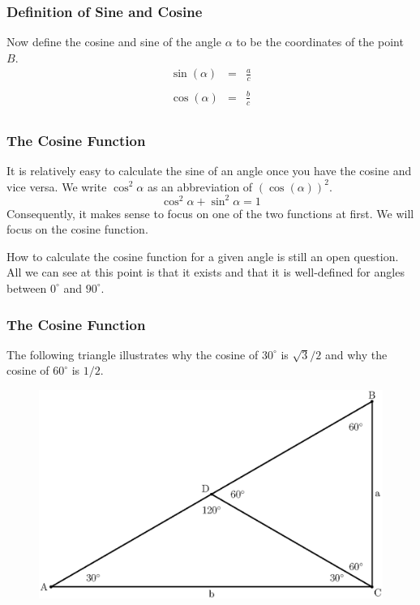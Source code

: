 \documentclass[xcolor=dvipsnames]{beamer}
\begin{document}
\begin{frame}
  \frametitle{Definition of Sine and Cosine}
Now define the cosine and sine of the angle $\alpha$ to be the
coordinates of the point $B$.
\begin{equation}
  \label{eq:eesiacha}
  \begin{array}{rcl}
    \sin(\alpha)&=&\frac{a}{c} \\
    && \\
    \cos(\alpha)&=&\frac{b}{c} \\
  \end{array}
\end{equation}
\end{frame}

\begin{frame}
  \frametitle{The Cosine Function}
  It is relatively easy to calculate the sine of an angle once you
  have the cosine and vice versa. We write $\cos^{2}\alpha$ as an
  abbreviation of $(\cos(\alpha))^{2}$.
  \begin{equation}
    \label{eq:aejeecob}
    \cos^{2}\alpha+\sin^{2}\alpha=1
  \end{equation}
  Consequently, it makes sense to focus on one of the two functions at
  first. We will focus on the cosine function.

  \bigskip
  
  How to calculate the cosine function for a given angle is still an
  open question. All we can see at this point is that it exists and
  that it is well-defined for angles between $0^{\circ}$ and
  $90^{\circ}$.
\end{frame}

\begin{frame}
  \frametitle{The Cosine Function}
  The following triangle illustrates why the cosine of
  $30^{\circ}$ is $\sqrt{3}/2$ and why the cosine of $60^{\circ}$ is
  $1/2$.
  \begin{figure}[h]
    \includegraphics[scale=.5]{./thirty.eps}
  \end{figure}
\end{frame}
\end{document}

